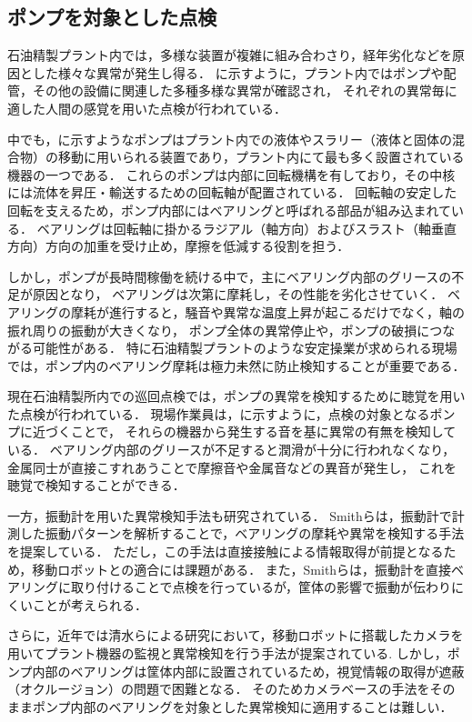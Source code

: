 \documentclass[../main]{subfiles}
\begin{document}
\subsection{ポンプを対象とした点検}
\label{sec:intro_plant_characteristics}


石油精製プラント内では，多様な装置が複雑に組み合わさり，経年劣化などを原因とした様々な異常が発生し得る．
に示すように，プラント内ではポンプや配管，その他の設備に関連した多種多様な異常が確認され，
それぞれの異常毎に適した人間の感覚を用いた点検が行われている．


中でも，に示すようなポンプはプラント内での液体やスラリー（液体と固体の混合物）の移動に用いられる装置であり，プラント内にて最も多く設置されている機器の一つである．
これらのポンプは内部に回転機構を有しており，その中核には流体を昇圧・輸送するための回転軸が配置されている．
回転軸の安定した回転を支えるため，ポンプ内部にはベアリングと呼ばれる部品が組み込まれている．
ベアリングは回転軸に掛かるラジアル（軸方向）およびスラスト（軸垂直方向）方向の加重を受け止め，摩擦を低減する役割を担う．

しかし，ポンプが長時間稼働を続ける中で，主にベアリング内部のグリースの不足が原因となり，
ベアリングは次第に摩耗し，その性能を劣化させていく．
ベアリングの摩耗が進行すると，騒音や異常な温度上昇が起こるだけでなく，軸の振れ周りの振動が大きくなり，
ポンプ全体の異常停止や，ポンプの破損につながる可能性がある．
特に石油精製プラントのような安定操業が求められる現場では，ポンプ内のベアリング摩耗は極力未然に防止検知することが重要である．

現在石油精製所内での巡回点検では，ポンプの異常を検知するために聴覚を用いた点検が行われている．
現場作業員は，に示すように，点検の対象となるポンプに近づくことで，
それらの機器から発生する音を基に異常の有無を検知している．
ベアリング内部のグリースが不足すると潤滑が十分に行われなくなり，金属同士が直接こすれあうことで摩擦音や金属音などの異音が発生し，
これを聴覚で検知することができる．

一方，振動計を用いた異常検知手法も研究されている\cite{SMITH2015100}．
Smithらは，振動計で計測した振動パターンを解析することで，ベアリングの摩耗や異常を検知する手法を提案している．
ただし，この手法は直接接触による情報取得が前提となるため，移動ロボットとの適合には課題がある．
また，Smithらは，振動計を直接ベアリングに取り付けることで点検を行っているが，筐体の影響で振動が伝わりにくいことが考えられる．


さらに，近年では清水らによる研究において，移動ロボットに搭載したカメラを用いてプラント機器の監視と異常検知を行う手法が提案されている\cite{shimizu2024change}.
しかし，ポンプ内部のベアリングは筐体内部に設置されているため，視覚情報の取得が遮蔽（オクルージョン）の問題で困難となる．
そのためカメラベースの手法をそのままポンプ内部のベアリングを対象とした異常検知に適用することは難しい．
\end{document}
